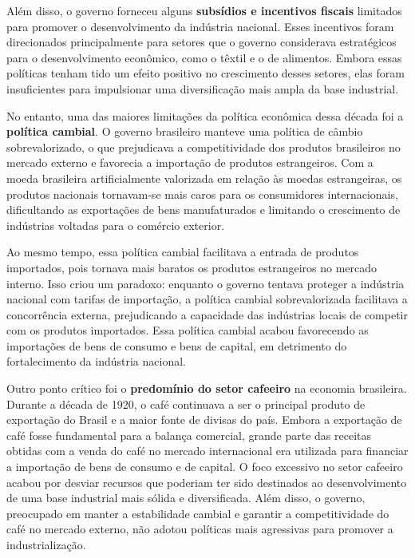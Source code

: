 \documentclass[a4paper,12pt]{article}[abntex2]
\begin{document}
Além disso, o governo forneceu alguns \textbf{subsídios e incentivos fiscais} limitados para promover o desenvolvimento da indústria nacional. Esses incentivos foram direcionados principalmente para setores que o governo considerava estratégicos para o desenvolvimento econômico, como o têxtil e o de alimentos. Embora essas políticas tenham tido um efeito positivo no crescimento desses setores, elas foram insuficientes para impulsionar uma diversificação mais ampla da base industrial.

No entanto, uma das maiores limitações da política econômica dessa década foi a \textbf{política cambial}. O governo brasileiro manteve uma política de câmbio sobrevalorizado, o que prejudicava a competitividade dos produtos brasileiros no mercado externo e favorecia a importação de produtos estrangeiros. Com a moeda brasileira artificialmente valorizada em relação às moedas estrangeiras, os produtos nacionais tornavam-se mais caros para os consumidores internacionais, dificultando as exportações de bens manufaturados e limitando o crescimento de indústrias voltadas para o comércio exterior.

Ao mesmo tempo, essa política cambial facilitava a entrada de produtos importados, pois tornava mais baratos os produtos estrangeiros no mercado interno. Isso criou um paradoxo: enquanto o governo tentava proteger a indústria nacional com tarifas de importação, a política cambial sobrevalorizada facilitava a concorrência externa, prejudicando a capacidade das indústrias locais de competir com os produtos importados. Essa política cambial acabou favorecendo as importações de bens de consumo e bens de capital, em detrimento do fortalecimento da indústria nacional.

Outro ponto crítico foi o \textbf{predomínio do setor cafeeiro} na economia brasileira. Durante a década de 1920, o café continuava a ser o principal produto de exportação do Brasil e a maior fonte de divisas do país. Embora a exportação de café fosse fundamental para a balança comercial, grande parte das receitas obtidas com a venda do café no mercado internacional era utilizada para financiar a importação de bens de consumo e de capital. O foco excessivo no setor cafeeiro acabou por desviar recursos que poderiam ter sido destinados ao desenvolvimento de uma base industrial mais sólida e diversificada. Além disso, o governo, preocupado em manter a estabilidade cambial e garantir a competitividade do café no mercado externo, não adotou políticas mais agressivas para promover a industrialização.
\end{document}
